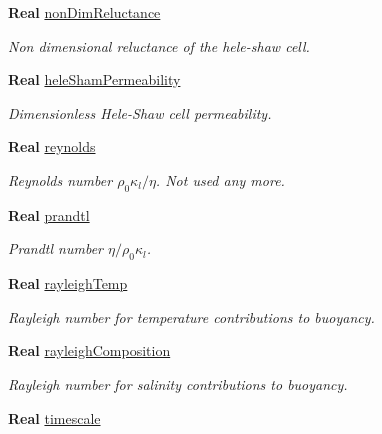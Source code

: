 \begin{DoxyCompactItemize}
\textbf{ Real} \hyperlink{class_mushy_layer_params_a157dde93ce7d9c83740fb9fc7fc0aadd}{non\+Dim\+Reluctance}
\begin{DoxyCompactList}\small\item\em Non dimensional reluctance of the hele-\/shaw cell. \end{DoxyCompactList}\item 
\textbf{ Real} \hyperlink{class_mushy_layer_params_add7d54ce252c7efdaad45e934fdff49d}{hele\+Sham\+Permeability}
\begin{DoxyCompactList}\small\item\em Dimensionless Hele-\/\+Shaw cell permeability. \end{DoxyCompactList}\item 
\mbox{\label{class_mushy_layer_params_a6d4d8af975cb229d66da7b66b84de8e1}} 
\textbf{ Real} \hyperlink{class_mushy_layer_params_a6d4d8af975cb229d66da7b66b84de8e1}{reynolds}
\begin{DoxyCompactList}\small\item\em Reynolds number $ \rho_0 \kappa_l / \eta $. Not used any more. \end{DoxyCompactList}\item 
\mbox{\label{class_mushy_layer_params_a5b15d882a9c331fd9e63873e7bf44b80}} 
\textbf{ Real} \hyperlink{class_mushy_layer_params_a5b15d882a9c331fd9e63873e7bf44b80}{prandtl}
\begin{DoxyCompactList}\small\item\em Prandtl number $ \eta / \rho_0 \kappa_l $. \end{DoxyCompactList}\item 
\textbf{ Real} \hyperlink{class_mushy_layer_params_ada4f0f588513e96f72dcb1ba35a2585f}{rayleigh\+Temp}
\begin{DoxyCompactList}\small\item\em Rayleigh number for temperature contributions to buoyancy. \end{DoxyCompactList}\item 
\textbf{ Real} \hyperlink{class_mushy_layer_params_a7caaf9bff2bf7525386717144ecb7118}{rayleigh\+Composition}
\begin{DoxyCompactList}\small\item\em Rayleigh number for salinity contributions to buoyancy. \end{DoxyCompactList}\item 
\textbf{ Real} \hyperlink{class_mushy_layer_params_a77c66c8908da36411b789c07dd412eca}{timescale}

\end{DoxyCompactItemize}
